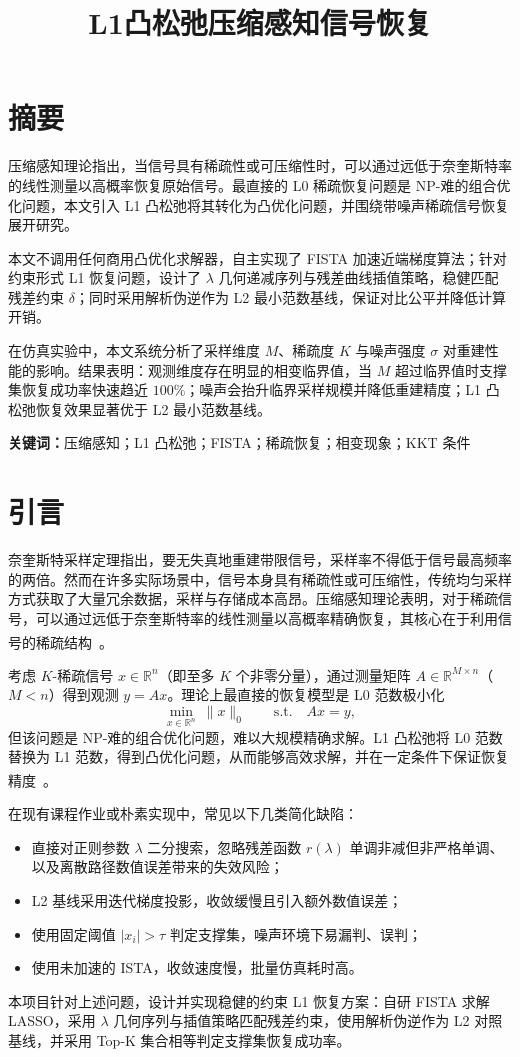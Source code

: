 \documentclass[UTF8]{ctexart}
\title{L1凸松弛压缩感知信号恢复}
\author{}
\date{}
\numberwithin{figure}{section}
\newcommand{\scite}[1]{\textsuperscript{\cite{#1}}}
\theoremstyle{definition}
\theoremstyle{examplestyle}
\theoremstyle{remark}
\begin{document}
\maketitle

\section{摘要}
\label{sec:abstract}

压缩感知理论指出，当信号具有稀疏性或可压缩性时，可以通过远低于奈奎斯特率的线性测量以高概率恢复原始信号。最直接的 L0 稀疏恢复问题是 NP-难的组合优化问题，本文引入 L1 凸松弛将其转化为凸优化问题，并围绕带噪声稀疏信号恢复展开研究。

本文不调用任何商用凸优化求解器，自主实现了 FISTA 加速近端梯度算法；针对约束形式 L1 恢复问题，设计了 $\lambda$ 几何递减序列与残差曲线插值策略，稳健匹配残差约束 $\delta$；同时采用解析伪逆作为 L2 最小范数基线，保证对比公平并降低计算开销。

在仿真实验中，本文系统分析了采样维度 $M$、稀疏度 $K$ 与噪声强度 $\sigma$ 对重建性能的影响。结果表明：观测维度存在明显的相变临界值，当 $M$ 超过临界值时支撑集恢复成功率快速趋近 $100\%$；噪声会抬升临界采样规模并降低重建精度；L1 凸松弛恢复效果显著优于 L2 最小范数基线。

\noindent\textbf{关键词：}压缩感知；L1 凸松弛；FISTA；稀疏恢复；相变现象；KKT 条件

\section{引言}
\label{sec:intro}

奈奎斯特采样定理指出，要无失真地重建带限信号，采样率不得低于信号最高频率的两倍。然而在许多实际场景中，信号本身具有稀疏性或可压缩性，传统均匀采样方式获取了大量冗余数据，采样与存储成本高昂。压缩感知理论表明，对于稀疏信号，可以通过远低于奈奎斯特率的线性测量以高概率精确恢复，其核心在于利用信号的稀疏结构~\scite{donoho2006}。

考虑 $K$-稀疏信号 $x\in\mathbb{R}^n$（即至多 $K$ 个非零分量），通过测量矩阵 $A\in\mathbb{R}^{M\times n}$（$M<n$）得到观测 $y=Ax$。理论上最直接的恢复模型是 L0 范数极小化
\[
\min_{x\in\mathbb{R}^n}\ \|x\|_0 \qquad \text{s.t.} \quad Ax=y,
\]
但该问题是 NP-难的组合优化问题，难以大规模精确求解。L1 凸松弛将 L0 范数替换为 L1 范数，得到凸优化问题，从而能够高效求解，并在一定条件下保证恢复精度~\scite{candes2006stable}。

在现有课程作业或朴素实现中，常见以下几类简化缺陷：
\begin{itemize}
\item 直接对正则参数 $\lambda$ 二分搜索，忽略残差函数 $r(\lambda)$ 单调非减但非严格单调、以及离散路径数值误差带来的失效风险；
\item L2 基线采用迭代梯度投影，收敛缓慢且引入额外数值误差；
\item 使用固定阈值 $|x_i|>\tau$ 判定支撑集，噪声环境下易漏判、误判；
\item 使用未加速的 ISTA，收敛速度慢，批量仿真耗时高。
\end{itemize}
本项目针对上述问题，设计并实现稳健的约束 L1 恢复方案：自研 FISTA 求解 LASSO，采用 $\lambda$ 几何序列与插值策略匹配残差约束，使用解析伪逆作为 L2 对照基线，并采用 Top-K 集合相等判定支撑集恢复成功率。
\end{document}
